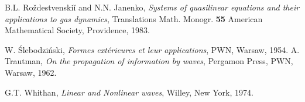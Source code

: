 \documentclass{birkjour}
\theoremstyle{definition}
\theoremstyle{remark}
\numberwithin{equation}{section}
\numberwithin{equation}{section}
\numberwithin{thm}{section}
\numberwithin{equation}{section}
\numberwithin{thm}{section}
\begin{document}
\begin{thebibliography}{10}
	B.L. Ro\v{z}destvenski\v{i} and N.N. Janenko, {\it Systems of quasilinear equations and their applications to gas dynamics}, Translations Math. Monogr. {\bf 55} American Mathematical Society, Providence, 1983. 
	
	W. \'Slebodzi\'nski, {\sl Formes ext\'erieures et leur applications}, PWN, Warsaw, 1954.
	A. Trautman, {\sl On the propagation of information by waves}, Pergamon Press, PWN, Warsaw, 1962.
	
	G.T. Whithan, {\sl Linear and Nonlinear waves}, Willey, New York, 1974. 
	
	
	
\end{thebibliography}

%
%
\end{document}
